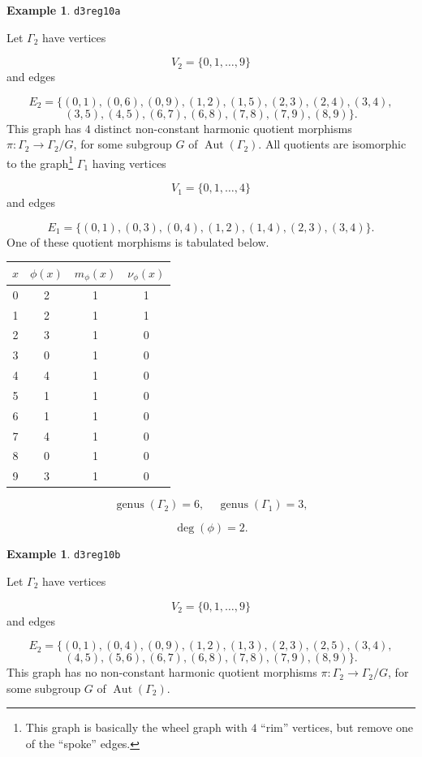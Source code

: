 \documentclass[12pt,letterpaper]{article}
\theoremstyle{definition}
\newtheorem{example}[theorem]{Example}
\DeclareMathOperator{\Aut}{Aut}
\DeclareMathOperator{\genus}{genus}
\begin{document}
\begin{example}%
\label{example:d3reg10a}
  {\tt d3reg10a}\newline
{\rm  
Let $\Gamma_2$ have vertices

\[
V_2=\{0,1,\dots,9\}
\]
and edges

\[
E_2 = \{
(0, 1), (0, 6), (0, 9), (1, 2), (1, 5), (2, 3), (2, 4), (3, 4),
\]
\[
(3, 5), (4, 5), (6, 7), (6, 8), (7, 8), (7, 9), (8, 9)
\}.
\]
This graph has $4$ distinct non-constant harmonic quotient
morphisms $\pi: \Gamma_2\to \Gamma_2/G$, for some subgroup
$G$ of $\Aut(\Gamma_2)$. All quotients are isomorphic to the
graph\footnote{This graph is basically the wheel graph
with $4$ ``rim'' vertices, but remove one of the ``spoke'' edges.
}
$\Gamma_1$ having vertices

\[
V_1=\{0,1,\dots,4\}
\]
and edges

\[
E_1 = \{
(0, 1), (0, 3), (0, 4), (1, 2), (1, 4), (2, 3), (3, 4)
\}.
\]
One of these quotient morphisms is tabulated below.
\begin{center}
\begin{tabular}{c|c|c|c}  
  $x$ & $\phi(x)$ & $m_\phi(x)$ & $\nu_\phi(x)$ \\ \hline
  0   &    2   &        1         &  1   \\ 
  1   &    2   &        1         &  1   \\ 
  2   &    3   &        1         &  0   \\ 
  3   &    0   &        1         &  0   \\ 
  4   &    4   &        1         &  0   \\ 
  5   &    1   &        1         &  0    \\ 
  6   &    1   &        1         &  0   \\ 
  7   &    4   &        1         &  0   \\
  8   &    0   &        1         &  0   \\
  9   &    3   &        1         &  0   \\ 
\end{tabular}
\end{center}

\[
  \genus(\Gamma_2) =6,\ \ \ \ \
  \genus(\Gamma_1) =3,
\]

\[
\deg(\phi) =2.
\]

}
\end{example}


\begin{example}%
\label{example:d3reg10b}
  {\tt d3reg10b}\newline
{\rm  
Let $\Gamma_2$ have vertices

\[
V_2=\{0,1,\dots,9\}
\]
and edges

\[
E_2 = \{
(0, 1), (0, 4), (0, 9), (1, 2), (1, 3), (2, 3), (2, 5), (3, 4),
\]
\[
(4, 5), (5, 6), (6, 7), (6, 8), (7, 8), (7, 9), (8, 9)
\}.
\]
This graph has no non-constant harmonic quotient
morphisms $\pi: \Gamma_2\to \Gamma_2/G$, for some subgroup
$G$ of $\Aut(\Gamma_2)$.

}
\end{example}
\end{document}
